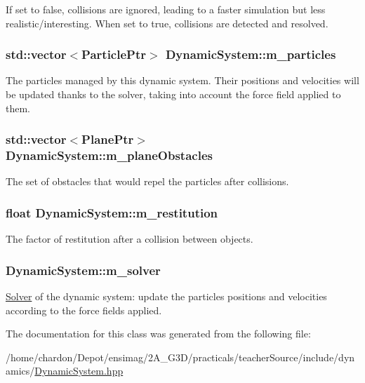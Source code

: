 If set to false, collisions are ignored, leading to a faster simulation but less realistic/interesting. When set to true, collisions are detected and resolved. \hypertarget{classDynamicSystem_a5ffb31272437d0d2194fb9a3e2503507}{
\subsubsection[{m\+\_\+particles}]{\setlength{\rightskip}{0pt plus 5cm}std\+::vector$<${\bf Particle\+Ptr}$>$ Dynamic\+System\+::m\+\_\+particles\hspace{0.3cm}{\ttfamily [private]}}}\label{classDynamicSystem_a5ffb31272437d0d2194fb9a3e2503507}
The particles managed by this dynamic system. Their positions and velocities will be updated thanks to the solver, taking into account the force field applied to them. \hypertarget{classDynamicSystem_a64b84936db934e46bf4d14d298536f29}{
\subsubsection[{m\+\_\+plane\+Obstacles}]{\setlength{\rightskip}{0pt plus 5cm}std\+::vector$<${\bf Plane\+Ptr}$>$ Dynamic\+System\+::m\+\_\+plane\+Obstacles\hspace{0.3cm}{\ttfamily [private]}}}\label{classDynamicSystem_a64b84936db934e46bf4d14d298536f29}
The set of obstacles that would repel the particles after collisions. \hypertarget{classDynamicSystem_aac91bdfa64bc41fcf1284547b7201e03}{
\subsubsection[{m\+\_\+restitution}]{\setlength{\rightskip}{0pt plus 5cm}float Dynamic\+System\+::m\+\_\+restitution\hspace{0.3cm}{\ttfamily [private]}}}\label{classDynamicSystem_aac91bdfa64bc41fcf1284547b7201e03}
The factor of restitution after a collision between objects. \hypertarget{classDynamicSystem_a5c1688e3ba7e44f1231949a27107f8af}{
\subsubsection[{m\+\_\+solver}]{ Dynamic\+System\+::m\+\_\+solver\hspace{0.3cm}{\ttfamily [private]}}}\label{classDynamicSystem_a5c1688e3ba7e44f1231949a27107f8af}
\hyperlink{classSolver}{Solver} of the dynamic system\+: update the particles positions and velocities according to the force fields applied. 

The documentation for this class was generated from the following file\+:\begin{DoxyCompactItemize}
\item 
/home/chardon/\+Depot/ensimag/2\+A\+\_\+\+G3\+D/practicals/teacher\+Source/include/dynamics/\hyperlink{DynamicSystem_8hpp}{Dynamic\+System.\+hpp}\end{DoxyCompactItemize}
